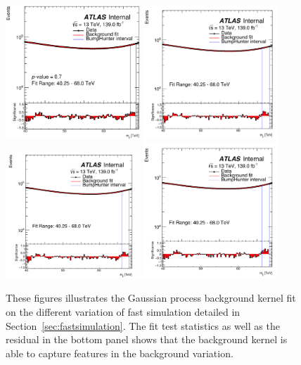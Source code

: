 \begin{figure}[!htb]
    \begin{center}
        \includegraphics[width=0.45\textwidth]{figures/chapter_dimuon/nominal}        
        \includegraphics[width=0.45\textwidth]{figures/chapter_dimuon/up}        
        \includegraphics[width=0.45\textwidth]{figures/chapter_dimuon/down}        
        \includegraphics[width=0.45\textwidth]{figures/chapter_dimuon/eta}        
        \caption{
        These figures illustrates the Gaussian process background kernel fit on the different variation of fast simulation detailed in Section~\ref{sec:fastsimulation}. The fit test statistics as well as the residual in the bottom panel shows that the background kernel is able to capture features in the background variation. 
        }
        \label{fig:dimuonmass}
    \end{center}
\end{figure}
\FloatBarrier

